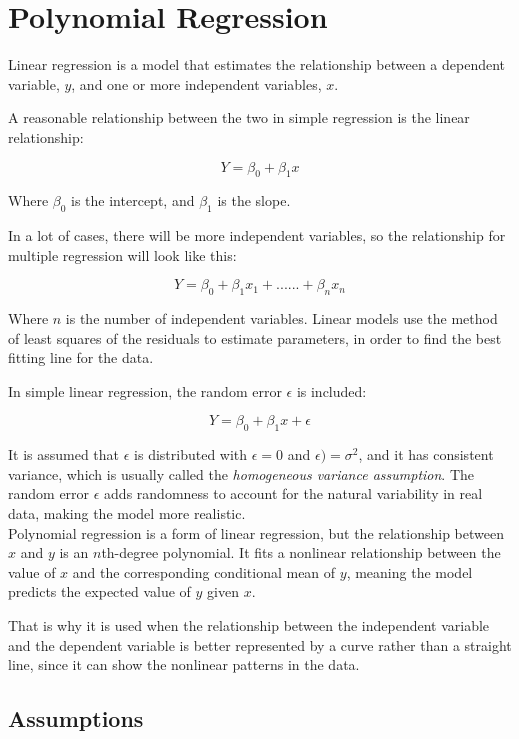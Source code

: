 
\section*{Polynomial Regression}
Linear regression is a model that estimates the relationship between a dependent variable, \( y \), and one or more independent variables, \( x \).

A reasonable relationship between the two in simple regression is the linear relationship:

\[
Y = \beta_0 + \beta_1 x
\]

Where \( \beta_0 \) is the intercept, and \( \beta_1 \) is the slope.

In a lot of cases, there will be more independent variables, so the relationship for multiple regression will look like this:

\[
Y = \beta_0 + \beta_1 x_1 + ......+ \beta_n x_n
\]



Where \( n \) is the number of independent variables. Linear models use the method of least squares of the residuals to estimate parameters, in order to find the best fitting line for the data.

In simple linear regression, the random error \( \epsilon \) is included:

\[
Y = \beta_0 + \beta_1 x + \epsilon
\]

It is assumed that \( \epsilon \) is distributed with $\epsilon = 0$ and $\epsilon) = \sigma^2$, and it has consistent variance, which is usually called the \textit{homogeneous variance assumption}. The random error \( \epsilon \) adds randomness to account for the natural variability in real data, making the model more realistic.
\newline\\
Polynomial regression is a form of linear regression, but the relationship between \( x \) and \( y \) is an \( n \)th-degree polynomial. It fits a nonlinear relationship between the value of \( x \) and the corresponding conditional mean of \( y \), meaning the model predicts the expected value of \( y \) given \( x \).

That is why it is used when the relationship between the independent variable and the dependent variable is better represented by a curve rather than a straight line, since it can show the nonlinear patterns in the data.

	\subsection{Assumptions}
	